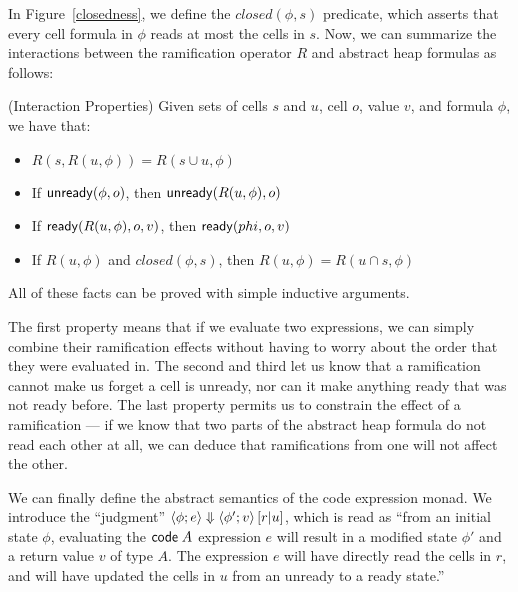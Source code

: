 In Figure~\ref{closedness}, we define the $closed(\phi, s)$ predicate,
which asserts that every cell formula in $\phi$ reads at most the
cells in $s$. Now, we can summarize the interactions between the 
ramification operator $R$ and abstract heap formulas as follows: 

\begin{prop}{(Interaction Properties)}
Given sets of cells $s$ and $u$, cell $o$, value $v$, and formula $\phi$, we have
that:
\begin{itemize}
\item $R(s, R(u, \phi)) = R(s \cup u, \phi)$
\item If $\mathsf{unready}({\phi}, {o})$, then $\mathsf{unready}({R(u, \phi)}, {o})$ 
\item If $\mathsf{ready}({R(u, \phi)}, {o}, {v})$, then $\mathsf{ready}({phi}, {o}, {v})$ 
\item If $R(u, \phi)$ and $closed(\phi, s)$, then $R(u, \phi) = R(u \cap s, \phi)$ 
\end{itemize}
\end{prop}

All of these facts can be proved with simple inductive arguments. 

The first property means that if we evaluate two expressions, we can
simply combine their ramification effects without having to worry
about the order that they were evaluated in. The second and third let
us know that a ramification cannot make us forget a cell is unready,
nor can it make anything ready that was not ready before. The last
property permits us to constrain the effect of a ramification --- if we
know that two parts of the abstract heap formula do not read each
other at all, we can deduce that ramifications from one will not
affect the other.

We can finally define the abstract semantics of the code expression
monad. We introduce the ``judgment''
$\left<{\phi};{e}\right>\Downarrow\left<{\phi'};{v}\right>\left[{r}|{u}\right]$, which is read as ``from an initial
state $\phi$, evaluating the $\mathsf{code}\;{A}$ expression $e$ will result
in a modified state $\phi'$ and a return value $v$ of type $A$. The
expression $e$ will have directly read the cells in $r$, and will have
updated the cells in $u$ from an unready to a ready state.'' 

